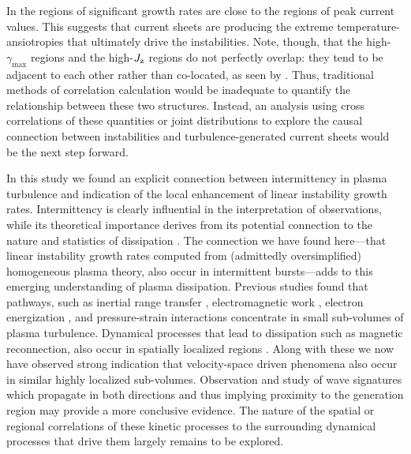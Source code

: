         In  the regions of significant growth rates are close to
        the regions of peak current values. This suggests that current sheets are producing the
        extreme temperature-ansiotropies that ultimately drive the instabilities. Note, though, that
        the high-$\gamma_{\max}$ regions and the high-$J_{\rm z}$ regions do not perfectly overlap:
        they tend to be adjacent to each other rather than co-located, as seen by \citet{Greco2012}.
        Thus, traditional methods of correlation calculation would be inadequate to quantify the
        relationship between these two structures. Instead, an analysis using cross correlations of
        these quantities \citep[see, e.g.,][]{Parashar2016} or joint distributions \citep[see,
        e.g.,][]{Yang2017} to explore the causal connection between instabilities and
        turbulence-generated current sheets would be the next step forward.

        In this study we found an explicit connection between intermittency in plasma turbulence and
        indication of the local enhancement of linear instability growth rates. Intermittency is
        clearly influential in the interpretation of observations, while its theoretical importance
        derives from its potential connection to the nature and statistics of dissipation
        \citet{Kolmogorov1962, Karimabadi2013, Wan2016, Howes2015, Matthaeus2015}. The connection we
        have found here---that linear instability growth rates computed from (admittedly
        oversimplified) homogeneous plasma theory, also occur in intermittent bursts---adds to this
        emerging understanding of plasma dissipation. Previous studies found that pathways, such as
        inertial range transfer \citep{SorrisoValvo2019}, electromagnetic work \citep{Wan2012},
        electron energization \citep{Karimabadi2013}, and pressure-strain interactions
        \citep{Yang2017} concentrate in small sub-volumes of plasma turbulence. Dynamical processes
        that lead to dissipation such as magnetic reconnection, also occur in spatially localized
        regions \citep{Drake2008}. Along with these we now have observed strong indication that
        velocity-space driven phenomena \citep{Servidio2012a, Greco2012, Schekochihin2016,
        Servidio2015} also occur in similar highly localized sub-volumes. Observation and study of
        wave signatures which propagate in both directions and thus implying proximity to the
        generation region may provide a more conclusive evidence. The nature of the spatial or
        regional correlations of these kinetic processes to the surrounding dynamical processes that
        drive them largely remains to be explored.